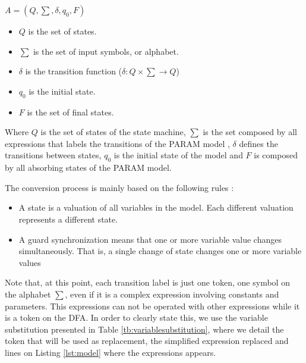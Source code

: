 \documentclass[conference]{IEEEtran}
\begin{document}
	$A = (Q, \sum, \delta, q_{0}, F) $
	
	\begin{itemize}
		\item $Q$ is the set of states.
		\item $\sum$ is the set of input symbols, or alphabet.
		\item $\delta$ is the transition function ($\delta:Q \times \sum  \rightarrow Q$)
		\item $q_{0}$ is the initial state.
		\item $F$ is the set of final states.
	\end{itemize}

	
	Where $Q$ is the set of states of the state machine, $\sum$ is the set composed by all expressions that labels the transitions
	of the PARAM model
	, $\delta$ defines the transitions between states, 
	$q_{0}$ is the initial state of the model and $F$ is composed by all absorbing states of the PARAM model.	
		
	The conversion process is mainly based on the following rules \cite{alur}:
	
	\begin{itemize}
		\item A state is a valuation of all variables in the model. Each different valuation represents a different state.
		\item A guard synchronization means that one or more variable value changes simultaneously. That is, a single change of state changes one or more variable values
	\end{itemize}
	
	Note that, at this point, each transition label is just one token, one symbol on the alphabet $\sum$, even if it is
	a complex expression involving constants and parameters. This expressions can not be operated with other expressions
	while it is a token on the DFA.	In order to clearly state this, we use the variable
	substitution presented in Table \ref{tb:variablesubstitution}, where we detail the token that will be 
	used as replacement, the simplified expression replaced and lines on Listing \ref{lst:model} where the expressions appears.
	
\end{document}
